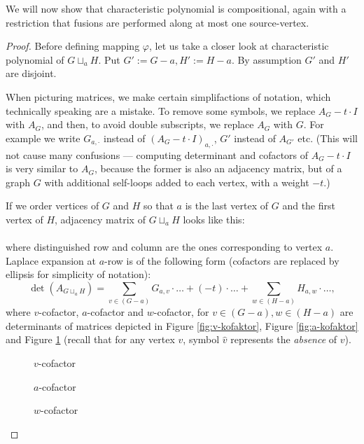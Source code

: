 We will now show that characteristic polynomial is compositional, again with a restriction that fusions are performed along at most one source-vertex. 
\lemmacharcompo*
\begin{proof}
Before defining mapping $\varphi$, let us take a closer look at characteristic polynomial of $G \sqcup_a H$.
Put $G':= G-a, H':=H-a$. By assumption $G'$ and $H'$ are disjoint. 

When picturing matrices, we make certain simplifactions of notation, which technically speaking are a mistake. To remove some symbols, we replace $A_G - t\cdot I$ with $A_G$, and then, to avoid double subscripts, we replace $A_G$ with $G$. For example we write  $G_{a,\cdot}$ instead of $(A_G - t\cdot I)_{a,\cdot}$, $G'$ instead of $A_{G'}$ etc. (This will not cause many confusions --- computing determinant and cofactors of $A_G - t\cdot I$ is very similar to $A_G$, because the former is also an adjacency matrix, but of a graph $G$ with additional self-loops added to each vertex, with a weight $-t$.)

If we order vertices of $G$ and $H$ so that $a$ is the last vertex of $G$ and the first vertex of $H$, adjacency matrix of $G\sqcup_aH$ looks like this: \\
\scalebox{\skalamatadjacency}{
	
}
\\
where distinguished row and column are the ones corresponding to vertex $a$.
Laplace expansion at $a$-row is of the following form (cofactors are replaced by ellipsis for simplicity of notation):
\begin{equation*}
\det(A_{G\sqcup_a H}) = \sum_{v \in (G-a)} G_{a, v} \cdot \ldots + (-t) \cdot \ldots + \sum_{w \in (H-a)} H_{a,w} \cdot \ldots,
\end{equation*}
where $v$-cofactor, $a$-cofactor and $w$-cofactor, for $v\in (G-a), w \in (H-a)$ are determinants of matrices depicted in Figure \ref{fig:v-kofaktor}, Figure \ref{fig:a-kofaktor} and Figure \ref{fig:w-kofaktor} (recall that for any vertex $v$, symbol $\widehat{v}$ represents the \emph{absence} of $v$).

\begin{figure}
	\scalebox{\skalamacierzy}{
		
	}
	\caption{$v$-cofactor}
	\label{fig:v-kofaktor}
	\scalebox{\skalamacierzy}{
		
	}
	\caption{$a$-cofactor}
	\label{fig:a-kofaktor}
	\scalebox{\skalamacierzy}{
		
	}
	\caption{$w$-cofactor}
	\label{fig:w-kofaktor}
\end{figure}



\end{proof}
